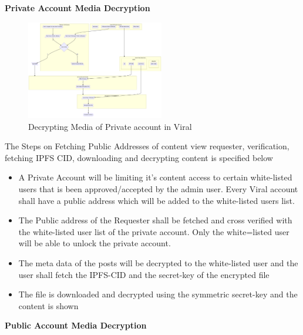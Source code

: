 \documentclass[conference]{IEEEtran}
\begin{document}
\textbf{Private Account Media Decryption}\\

\begin{figure}[H]
\begin{center}
\includegraphics[width=6cm]{decryption-private}
\caption{Decrypting Media of Private account in Viral}
\end{center}
\end{figure}

The Steps on Fetching Public Addresses of content view requester, verification, fetching IPFS CID, downloading and decrypting content is specified below
\begin{itemize}[wide, labelwidth=!, labelindent=0pt]
\item A Private Account will be limiting it's content access to certain white-listed users that is been approved/accepted by the admin user. Every Viral account shall have a public address which will be added to the white-listed users list.
\item The Public address of the Requester shall be fetched and cross verified with the white-listed user list of the private account. Only the white=listed user will be able to unlock the private account.
\item The meta data of the posts will be decrypted to the white-listed user and the user shall fetch the IPFS-CID and the secret-key of the encrypted file
\item The file is downloaded and decrypted using the symmetric secret-key and the content is shown
\end{itemize}


\textbf{Public Account Media Decryption}\\
\end{document}
